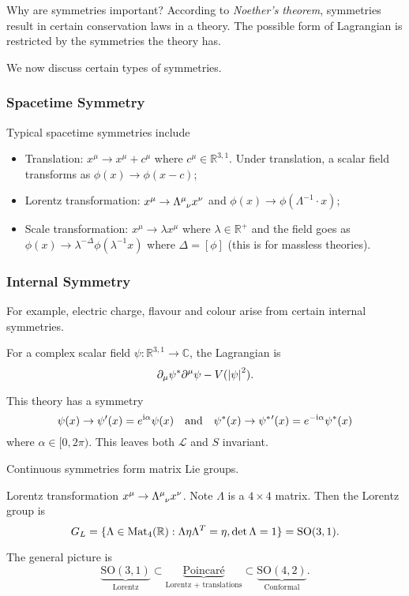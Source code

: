 \documentclass[a4paper,11pt]{article}
\begin{document}
	Why are symmetries important? According to \emph{Noether's theorem}, symmetries result in certain conservation laws in a theory. The possible form of Lagrangian is restricted by the symmetries the theory has.

	We now discuss certain types of symmetries.

	\subsubsection{Spacetime Symmetry}
	Typical spacetime symmetries include
	\begin{itemize}
		\item Translation: $x^\mu \to x^\mu + c^\mu$ where $c^\mu \in \mathbb{R}^{3,1}$. Under translation, a scalar field transforms as $\phi(x) \to \phi(x-c)$; 
		\item Lorentz transformation: $x^\mu \to \LT{\mu}{\nu}x^\nu$ and $\phi(x) \to \phi(\Lambda^{-1} \cdot x)$;
		\item Scale transformation: $x^\mu \to \lambda x^\mu$ where $\lambda \in \mathbb{R}^+$ and the field goes as $\phi(x) \to \lambda^{-\Delta}\phi(\lambda^{-1} x)$ where $\Delta = [\phi]$ (this is for massless theories). 
	\end{itemize}

	\subsubsection{Internal Symmetry}

	For example, electric charge, flavour and colour arise from certain internal symmetries.

	\begin{ex}
		For a complex scalar field $\psi : \mathbb{R}^{3,1}\to \mathbb{C}$, the Lagrangian is
		\[
			\partial_\mu \psi^* \partial^\mu \psi - V(\abs{\psi}^2).
		\]
		 
		This theory has a symmetry 
		\[
			\psi(x) \to \psi'(x) = e^{\mathrm{i}\alpha}\psi(x) \quad \text{and} \quad \psi^*(x) \to \psi^*\/'(x) = e^{-\mathrm{i}\alpha}\psi^*(x)
		\]
		where $\alpha \in [0,2\pi)$. This leaves both $\mathcal{L}$ and $S$ invariant.
	\end{ex}

	Continuous symmetries form matrix Lie groups.
	\begin{ex}
		Lorentz transformation $x^\mu \to \LT{\mu}{\nu} x^\nu$. Note $\Lambda$ is a $4 \times 4$ matrix. Then the Lorentz group is
		\[
			G_L = \{\Lambda \in \operatorname{Mat}_4(\mathbb{R}): \Lambda \eta \Lambda^T = \eta, \det \Lambda = 1\} = \mathrm{SO}(3,1).
		\]
		
		The general picture is
		\[
			\underbrace{\mathrm{SO}(3,1)}_{\text{Lorentz}} \subset \underbrace{\text{Poincar\'e}}_{\text{Lorentz + translations}} \subset \underbrace{\mathrm{SO}(4,2)}_{\text{Conformal}}.
		\]
	\end{ex}
\end{document}
